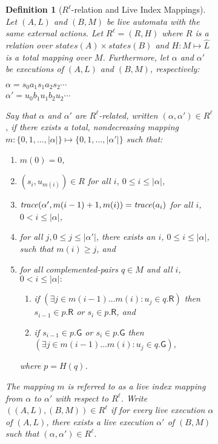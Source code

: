 \documentclass[11pt]{article}
\newcommand{\bn}{\begin{enumerate}}
\newcommand{\en}{\end{enumerate}}
\newcommand{\bd}{\begin{definition}}
\newcommand{\ed}{\end{definition}}
\newcommand{\intrdef}{\emph}	\newcommand{\intr}{\emph}
\newcommand{\ex}{\exists}
\renewcommand{\l}{\ell}
\newcommand{\G}{\mathsf{G}}
\newcommand{\R}{\mathsf{R}}
\newcommand{\al}{\alpha}
\newcommand{\clos}[1]{\widehat{{#1}}}	\newcommand{\esig}{\mathit{esig}}
\newcommand{\states}{\mathit{states}}
\newtheorem{definition}{Definition}
\newcommand{\ms}[1]{\relax\ifmmode
                \mathord{\mathcode`\-="702D\it #1\mathcode`\-="2200}\else
{\it #1}\fi
}
\begin{document}
\begin{figure}[htb]
\begin{figure}[htb]
\bd[$R^\l$-relation and Live Index Mappings] Let $(A,L)$ and $(B,M)$ be
live automata with the same external actions. Let $R^\l = (R,H)$ where 
$R$ is a relation over $\states(A) \times \states(B)$ and
$H: M \mapsto \clos{L}$ is a total mapping over $M$.
Furthermore, let $\alpha$ and
$\alpha'$ be executions of $(A,L)$ and $(B,M)$, respectively: \ms\\
\ind $\alpha  = s_0 a_1 s_1 a_2 s_2 \cdots$ \\
\ind $\alpha' = u_0 b_1 u_1 b_2 u_2 \cdots$ \ms\\
Say that $\alpha$ and $\alpha'$ are \intrdef{$R^\l$-related}, written
$(\alpha, \alpha') \in R^\l$, if there exists a total, nondecreasing mapping
$m: \{0,1,\ldots,|\alpha|\} \mapsto \{0,1,\ldots,|\alpha'|\}$
such that:
\bn
\item \label{clause:live-index-mapping:init} $m(0) = 0$,

\item \label{clause:live-index-mapping:corr}
      $(s_i, u_{m(i)}) \in R$ for all $i$, $0 \leq i \leq |\alpha|$,

\item \label{clause:live-index-mapping:trace}
      $\trace(\al', {m(i-1)+1}, {m(i)}) = \trace(a_i)$ for all 
               $i$, $0 < i \leq |\alpha|$,





\item \label{clause:live-index-mapping:cofinal}
      for all $j, 0 \leq j \leq |\alpha'|$, there exists an $i$, 
                  $0 \leq i \leq |\alpha|$, such that $m(i) \geq j$, and

\item \label{clause:live-index-mapping:pairs} for all complemented-pairs
$q \in M$ and all $i$, $0 < i \leq |\alpha|:$
   \bn
   \item \label{clause:live-index-mapping:RED}
         if $(\ex j \in m(i-1) \ldots m(i) : u_j \in q.\R)$ then
		$s_{i-1} \in p.\R$ or $s_i \in p.\R$, and

   \item \label{clause:live-index-mapping:GREEN}
         if $s_{i-1} \in p.\G$ or $s_i \in p.\G$ then
		$(\ex j \in m(i-1) \ldots m(i) : u_j \in q.\G)$,
   \en
where $p = H(q)$.
\en
The mapping $m$ is referred to as a \intrdef{live index mapping} from
$\alpha$ to $\alpha'$ with respect to $R^\l$.  Write $((A,L),(B,M)) \in
R^\l$ if for every live execution $\alpha$ of $(A,L)$, there exists a
live execution $\alpha'$ of $(B,M)$ such that $(\alpha,\alpha') \in
R^\l$.
\label{def:live-index-mapping}
\ed



\end{figure}
\end{figure}
\end{document}
